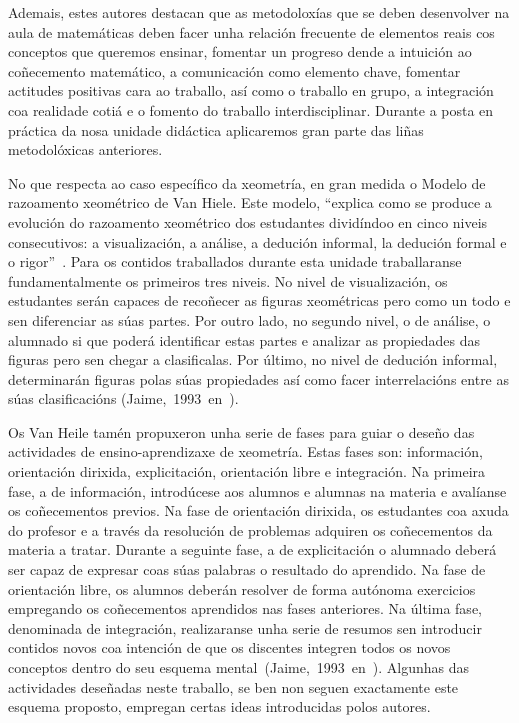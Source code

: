 Ademais, estes autores destacan que as metodoloxías que se deben desenvolver na aula de matemáticas deben facer unha relación frecuente de elementos reais cos conceptos que queremos ensinar, fomentar un progreso dende a intuición ao coñecemento matemático, a comunicación como elemento chave, fomentar actitudes positivas cara ao traballo, así como o traballo en grupo, a integración coa realidade cotiá e o fomento do traballo interdisciplinar. Durante a posta en práctica da nosa unidade didáctica aplicaremos gran parte das liñas metodolóxicas anteriores.

No que respecta ao caso específico da xeometría, en gran medida o Modelo de razoamento xeométrico de Van Hiele. Este modelo, ``explica como se produce a evolución do
razoamento xeométrico dos estudantes dividíndoo en cinco niveis consecutivos: a visualización, a análise, a dedución informal, la dedución formal e o rigor''~\cite[p.~81]{vargas2013modelo}. Para os contidos traballados durante esta unidade traballaranse fundamentalmente os primeiros tres niveis. No nivel de visualización, os estudantes serán capaces de recoñecer as figuras xeométricas pero como un todo e sen diferenciar as súas partes. Por outro lado, no segundo nivel, o de análise, o alumnado si que poderá identificar estas partes e analizar as propiedades das figuras pero sen chegar a clasificalas. Por último, no nivel de dedución informal, determinarán figuras polas súas propiedades así como facer interrelacións entre as súas clasificacións (Jaime,~1993~en~).

Os Van Heile tamén propuxeron unha serie de fases para guiar o deseño das actividades de ensino-aprendizaxe de xeometría. Estas fases son: información, orientación dirixida, explicitación, orientación libre e integración. Na primeira fase, a de información, introdúcese aos alumnos e alumnas na materia e avalíanse os coñecementos previos. Na fase de orientación dirixida, os estudantes coa axuda do profesor e a través da resolución de problemas adquiren os coñecementos da materia a tratar. Durante a seguinte fase, a de explicitación o alumnado deberá ser capaz de expresar coas súas palabras o resultado do aprendido. Na fase de orientación libre, os alumnos deberán resolver de forma autónoma exercicios empregando os coñecementos aprendidos nas fases anteriores. Na última fase, denominada de integración, realizaranse unha serie de resumos sen introducir contidos novos coa intención de que os discentes integren todos os novos conceptos dentro do seu esquema mental~(Jaime,~1993~en~). Algunhas das actividades deseñadas neste traballo, se ben non seguen exactamente este esquema proposto, empregan certas ideas introducidas polos autores.
